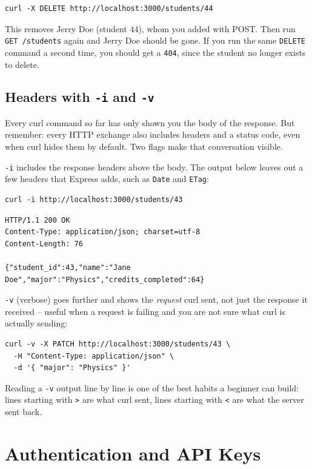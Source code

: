 \begin{verbatim}
curl -X DELETE http://localhost:3000/students/44
\end{verbatim}

This removes Jerry Doe (student 44), whom you added with POST. Then run \texttt{GET /students} again and Jerry Doe should be gone. If you
run the same \texttt{DELETE} command a second time, you should get a
\texttt{404}, since the student no longer exists to delete.

\subsection{Headers with \texttt{-i} and \texttt{-v}}

Every curl command so far has only shown you the body of the response.
But remember: every HTTP exchange also includes headers and a status
code, even when curl hides them by default. Two flags make that
conversation visible.

\texttt{-i} includes the response headers above the body. The output below leaves out a few headers that Express adds, such as \texttt{Date} and \texttt{ETag}:

\begin{verbatim}
curl -i http://localhost:3000/students/43
\end{verbatim}

\begin{verbatim}
HTTP/1.1 200 OK
Content-Type: application/json; charset=utf-8
Content-Length: 76
 
{"student_id":43,"name":"Jane Doe","major":"Physics","credits_completed":64}
\end{verbatim}

\texttt{-v} (verbose) goes further and shows the \emph{request} curl
sent, not just the response it received -- useful when a request is
failing and you are not sure what curl is actually sending:

\begin{verbatim}
curl -v -X PATCH http://localhost:3000/students/43 \
  -H "Content-Type: application/json" \
  -d '{ "major": "Physics" }'
\end{verbatim}

Reading a \texttt{-v} output line by line is one of the best habits a
beginner can build: lines starting with \texttt{>} are what curl sent,
lines starting with \texttt{<} are what the server sent back.

\section{Authentication and API Keys}

